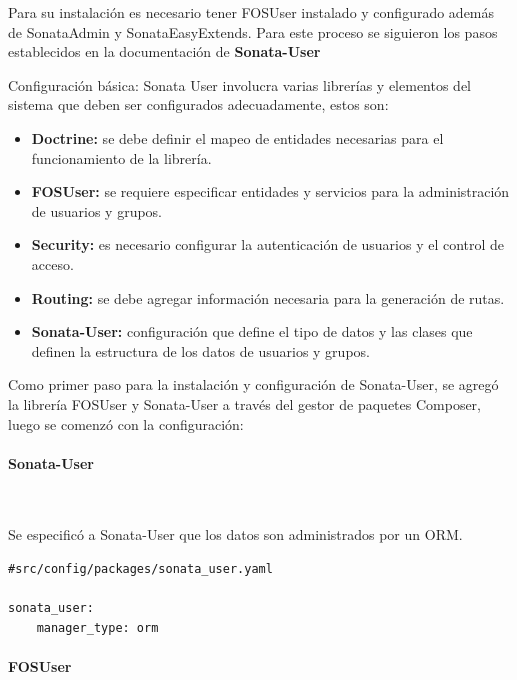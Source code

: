 Para su instalación es necesario tener FOSUser instalado y configurado además de SonataAdmin y SonataEasyExtends\@.
Para este proceso se siguieron los pasos establecidos en la documentación de \textbf{Sonata-User}~\parencite{sonata-user}

Configuración básica: Sonata User involucra varias librerías y elementos del sistema que deben ser configurados adecuadamente, estos son:

\begin{itemize}
    \item \textbf{Doctrine:} se debe definir el mapeo de entidades necesarias para el funcionamiento de la librería.
    \item \textbf{FOSUser:} se requiere especificar entidades y servicios para la administración de usuarios y grupos.
    \item \textbf{Security:} es necesario configurar la autenticación de usuarios y el control de acceso.
    \item \textbf{Routing:} se debe agregar información necesaria para la generación de rutas.
    \item \textbf{Sonata-User:} configuración que define el tipo de datos y las clases que definen la estructura de los datos de usuarios y grupos.
\end{itemize}



Como primer paso para la instalación y configuración de Sonata-User, se agregó la librería FOSUser y Sonata-User a través del gestor de paquetes Composer,
luego se comenzó con la configuración:

\paragraph{Sonata-User}~\newline

Se especificó a Sonata-User que los datos son administrados por un ORM.

\begin{lstlisting}[caption={archivo de configuración de sonata-user\\Fuente: \sonatainstallation.}]
#src/config/packages/sonata_user.yaml

sonata_user:
    manager_type: orm

\end{lstlisting}

\paragraph{FOSUser}~\newline

